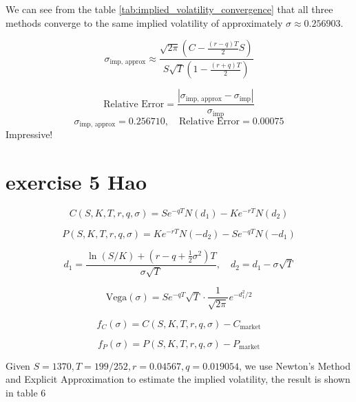 \documentclass{article}
\begin{document}
We can see from the table \ref{tab:implied_volatility_convergence} that all three methods converge to the same implied volatility of approximately \( \sigma \approx 0.256903 \).

\[
    \sigma_{\text{imp, approx}} \approx
    \frac{ \sqrt{2\pi} \left( C - \frac{(r - q)T}{2} S \right) }
    { S \sqrt{T} \left( 1 - \frac{(r + q)T}{2} \right) }
\]

\[
    \text{Relative Error} =
    \frac{ \left| \sigma_{\text{imp, approx}} - \sigma_{\text{imp}} \right| }
    { \sigma_{\text{imp}} }
\]
\[
    \sigma_{\text{imp, approx}} = 0.256710, \quad
    \text{Relative Error} = 0.00075
\]
Impressive!

\section{exercise 5 Hao}
\[
    C(S, K, T, r, q, \sigma) = S e^{-qT} N(d_1) - K e^{-rT} N(d_2)
\]

\[
    P(S, K, T, r, q, \sigma) = K e^{-rT} N(-d_2) - S e^{-qT} N(-d_1)
\]

\[
    d_1 = \frac{\ln(S/K) + (r - q + \frac{1}{2}\sigma^2)T}{\sigma \sqrt{T}}, \quad
    d_2 = d_1 - \sigma \sqrt{T}
\]

\[
    \text{Vega}(\sigma) = S e^{-qT} \sqrt{T} \cdot \frac{1}{\sqrt{2\pi}} e^{-d_1^2 / 2}
\]

\[
    f_C(\sigma) = C(S, K, T, r, q, \sigma) - C_{\text{market}}
\]

\[
    f_P(\sigma) = P(S, K, T, r, q, \sigma) - P_{\text{market}}
\]

Given \(S=1370, T = 199/252, r=0.04567, q=0.019054 \),
we use Newton's Method and Explicit Approximation to estimate the implied volatility,
the result is shown in table 6
\end{document}
